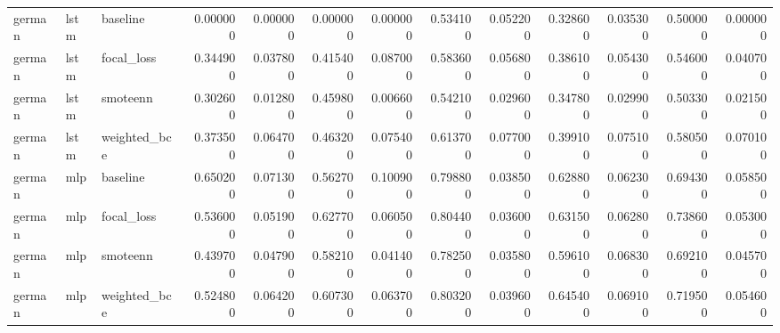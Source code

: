 \begin{tabular}{lllrrrrrrrrrr}
german & lstm & baseline & 0.000000 & 0.000000 & 0.000000 & 0.000000 & 0.534100 & 0.052200 & 0.328600 & 0.035300 & 0.500000 & 0.000000 \\
german & lstm & focal_loss & 0.344900 & 0.037800 & 0.415400 & 0.087000 & 0.583600 & 0.056800 & 0.386100 & 0.054300 & 0.546000 & 0.040700 \\
german & lstm & smoteenn & 0.302600 & 0.012800 & 0.459800 & 0.006600 & 0.542100 & 0.029600 & 0.347800 & 0.029900 & 0.503300 & 0.021500 \\
german & lstm & weighted_bce & 0.373500 & 0.064700 & 0.463200 & 0.075400 & 0.613700 & 0.077000 & 0.399100 & 0.075100 & 0.580500 & 0.070100 \\
german & mlp & baseline & 0.650200 & 0.071300 & 0.562700 & 0.100900 & 0.798800 & 0.038500 & 0.628800 & 0.062300 & 0.694300 & 0.058500 \\
german & mlp & focal_loss & 0.536000 & 0.051900 & 0.627700 & 0.060500 & 0.804400 & 0.036000 & 0.631500 & 0.062800 & 0.738600 & 0.053000 \\
german & mlp & smoteenn & 0.439700 & 0.047900 & 0.582100 & 0.041400 & 0.782500 & 0.035800 & 0.596100 & 0.068300 & 0.692100 & 0.045700 \\
german & mlp & weighted_bce & 0.524800 & 0.064200 & 0.607300 & 0.063700 & 0.803200 & 0.039600 & 0.645400 & 0.069100 & 0.719500 & 0.054600 \\
\bottomrule
\end{tabular}
